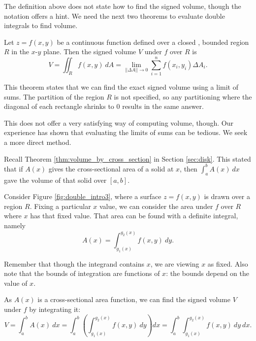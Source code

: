 The definition above does not state how to find the signed volume, though the notation offers a hint. We need the next two theorems to evaluate double integrals to find volume.

{Let $z=f(x,y)$ be a continuous function defined over a closed , bounded region $R$ in the $x$-$y$ plane. Then the signed volume $V$ under $f$ over $R$ is
$$V = \iint_R f(x,y)\ dA = \lim_{||\Delta A||\to 0}\sum_{i=1}^n f(x_i,y_i)\Delta A_i.$$
}

This theorem states that we can find the exact signed volume using a limit of sums. The partition of the region $R$ is not specified, so any partitioning where the diagonal of each rectangle shrinks to 0 results in the same answer. 

This does not offer a very satisfying way of computing volume, though. Our experience has shown that evaluating the limits of sums can be tedious. We seek a more direct method.

Recall Theorem \ref{thm:volume_by_cross_section} in Section \ref{sec:disk}. This stated that if $A(x)$ gives the cross-sectional area of a solid at $x$, then $\int_a^b A(x)\ dx$ gave the volume of that solid over $[a,b]$. 

Consider Figure \ref{fig:double_intro3}, where a surface $z=f(x,y)$ is drawn over a region $R$. Fixing a particular $x$ value, we can consider the area under $f$ over $R$ where $x$ has that fixed value. That area can be found with a definite integral, namely $$ A(x)=\int_{g_1(x)}^{g_2(x)} f(x,y)\ dy.$$

Remember that though the integrand contains $x$, we are viewing $x$ as fixed. Also note that the bounds of integration are functions of $x$: the bounds depend on the value of $x$. 


As $A(x)$ is a cross-sectional area function, we can find the signed volume $V$ under $f$ by integrating it:
$$V = \int_a^b A(x)\ dx = \int_a^b\left(\int_{g_1(x)}^{g_2(x)} f(x,y)\ dy\right)dx = \int_a^b\int_{g_1(x)}^{g_2(x)} f(x,y)\ dy\ dx.$$

